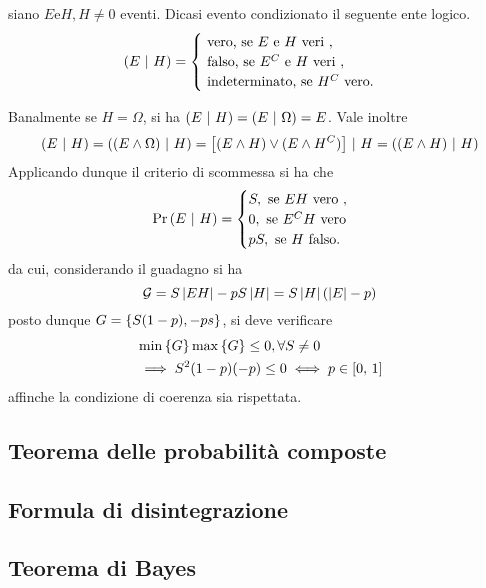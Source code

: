 \documentclass{subfiles}
\begin{document}
\begin{Definition*}
    siano \(E \text{e} H, H \neq 0\) eventi.
    Dicasi evento condizionato il seguente ente logico.
    \[(E \Given H) = \begin{cases}
            \text{vero, se} E \text{e} H \text{veri},      \\
            \text{falso, se} E^{C} \text{e} H \text{veri}, \\
            \text{indeterminato, se} H^{C} \text{vero.}
        \end{cases}\]
\end{Definition*}
Banalmente se \(H = \Omega\), si ha \((E \operatorname{\, | \,} H) = (E \operatorname{\, | \,} \Omega) = E\).
Vale inoltre
\[
    (E \operatorname{\, | \,} H) = ((E \land \Omega) \operatorname{\, | \,} H) = \left[(E \land H) \lor (E \land H^{C})\right] \operatorname{\, | \,} H = ((E \land H) \operatorname{\, | \,} H)
\]
Applicando dunque il criterio di scommessa si ha che
\[
    \Prob{E}[H] = \begin{cases}
        S, \text{se} EH \text{vero},    \\
        0, \text{se} E^{C}H \text{vero} \\
        pS, \text{se} H \text{falso.}
    \end{cases}\]
da cui, considerando il guadagno si ha
\[
    \mathcal{G} = S \left\vert {EH} \right\vert - pS\left\vert {H} \right\vert = S\left\vert {H} \right\vert (\left\vert {E} \right\vert - p)
\]
posto dunque \(G = \Set{S(1 - p), -ps}\), si deve verificare
\[\begin{aligned}
         & \Min*{G}\Max*{G} \le 0, \forall S \neq 0                 \\
         & \implies S^{2}(1 - p)(-p) \le 0 \iff p \in \Range*{0}{1}
    \end{aligned}\]
affinche la condizione di coerenza sia rispettata.

\subsection{Teorema delle probabilità composte}


\subsection{Formula di disintegrazione}

\clearpage

\subsection{Teorema di Bayes}

\clearpage
\end{document}
